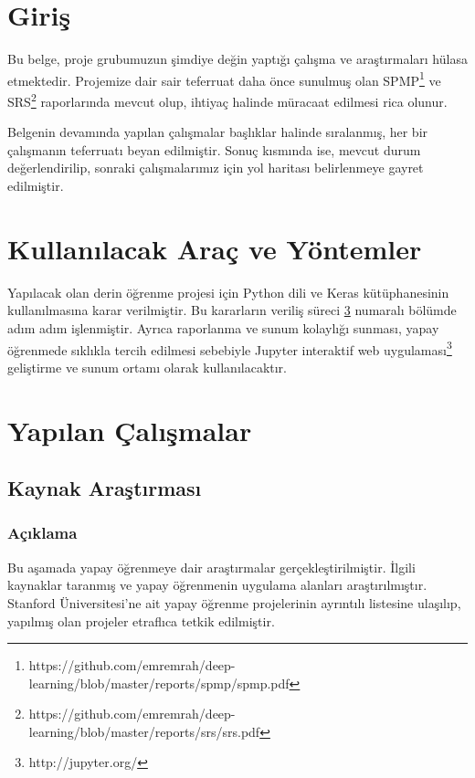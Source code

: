 \documentclass[12pt,a4paper]{article}
\begin{document}
    
    \newpage

    \tableofcontents
    \newpage


    \section{Giriş}
    Bu belge, proje grubumuzun şimdiye değin yaptığı çalışma ve araştırmaları hülasa etmektedir.
    Projemize dair sair teferruat daha önce sunulmuş olan SPMP\footnote{https://github.com/emremrah/deep-learning/blob/master/reports/spmp/spmp.pdf} ve SRS\footnote{https://github.com/emremrah/deep-learning/blob/master/reports/srs/srs.pdf} raporlarında mevcut olup,
    ihtiyaç halinde müracaat edilmesi rica olunur. 

    Belgenin devamında yapılan çalışmalar başlıklar halinde sıralanmış, her bir çalışmanın teferruatı beyan edilmiştir. Sonuç kısmında ise, mevcut durum değerlendirilip, sonraki çalışmalarımız için yol haritası belirlenmeye gayret edilmiştir.

    \section{Kullanılacak Araç ve Yöntemler}
    Yapılacak olan derin öğrenme projesi için Python dili ve Keras kütüphanesinin kullanılmasına karar verilmiştir.
    Bu kararların veriliş süreci \ref{yap} numaralı bölümde adım adım işlenmiştir. Ayrıca raporlanma ve sunum kolaylığı
    sunması, yapay öğrenmede sıklıkla tercih edilmesi sebebiyle Jupyter interaktif web uygulaması\footnote{http://jupyter.org/} geliştirme ve sunum ortamı olarak
    kullanılacaktır.

    \section{Yapılan Çalışmalar} \label{yap}
    \subsection{Kaynak Araştırması}
    \subsubsection{Açıklama}
    Bu aşamada yapay öğrenmeye dair araştırmalar gerçekleştirilmiştir. İlgili kaynaklar taranmış ve yapay öğrenmenin uygulama alanları araştırılmıştır.
    Stanford Üniversitesi'ne ait yapay öğrenme projelerinin ayrıntılı listesine ulaşılıp, yapılmış olan projeler etraflıca tetkik edilmiştir.
\end{document}
